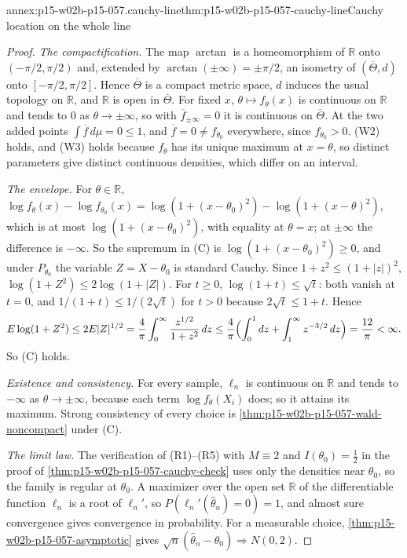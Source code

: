 \begin{annexitem}{annex:p15-w02b-p15-057.cauchy-line}{thm:p15-w02b-p15-057-cauchy-line}{Cauchy location on the whole line}
\begin{proof}
\emph{The compactification.} The map \(\arctan\) is a homeomorphism of
\(\mathbb R\) onto \((-\pi/2,\pi/2)\) and, extended by
\(\arctan(\pm\infty)=\pm\pi/2\), an isometry of
\((\overline\Theta,d)\) onto \([-\pi/2,\pi/2]\). Hence \(\overline\Theta\)
is a compact metric space, \(d\) induces the usual topology on
\(\mathbb R\), and \(\mathbb R\) is open in \(\overline\Theta\). For fixed
\(x\), \(\theta\mapsto f_\theta(x)\) is continuous on \(\mathbb R\) and
tends to \(0\) as \(\theta\to\pm\infty\), so with
\(\overline f_{\pm\infty}=0\) it is continuous on \(\overline\Theta\). At the
two added points \(\int\overline f\,d\mu=0\leq1\), and
\(\overline f=0\neq f_{\theta_0}\) everywhere, since \(f_{\theta_0}>0\).
(W2) holds, and (W3) holds because \(f_\theta\) has its unique maximum at
\(x=\theta\), so distinct parameters give distinct continuous densities,
which differ on an interval.

\emph{The envelope.} For \(\theta\in\mathbb R\),
\(\log f_\theta(x)-\log f_{\theta_0}(x)=\log(1+(x-\theta_0)^2)
-\log(1+(x-\theta)^2)\), which is at most \(\log(1+(x-\theta_0)^2)\), with
equality at \(\theta=x\); at \(\pm\infty\) the difference is \(-\infty\). So
the supremum in (C) is \(\log(1+(x-\theta_0)^2)\geq0\), and under
\(P_{\theta_0}\) the variable \(Z=X-\theta_0\) is standard Cauchy. Since
\(1+z^2\leq(1+|z|)^2\), \(\log(1+Z^2)\leq2\log(1+|Z|)\). For \(t\geq0\),
\(\log(1+t)\leq\sqrt t\): both vanish at \(t=0\), and
\(1/(1+t)\leq1/(2\sqrt t)\) for \(t>0\) because \(2\sqrt t\leq1+t\). Hence
\[
 E\log(1+Z^2)\leq2E|Z|^{1/2}
 =\frac4\pi\int_0^\infty\frac{z^{1/2}}{1+z^2}\,dz
 \leq\frac4\pi\Bigl(\int_0^1dz+\int_1^\infty z^{-3/2}\,dz\Bigr)
 =\frac{12}\pi<\infty .
\]
So (C) holds.

\emph{Existence and consistency.} For every sample, \(\ell_n\) is
continuous on \(\mathbb R\) and tends to \(-\infty\) as
\(\theta\to\pm\infty\), because each term \(\log f_\theta(X_i)\) does; so
it attains its maximum. Strong consistency of every choice is
\cref{thm:p15-w02b-p15-057-wald-noncompact} under (C).

\emph{The limit law.} The verification of (R1)--(R5) with \(M\equiv2\) and
\(I(\theta_0)=\tfrac12\) in the proof of
\cref{thm:p15-w02b-p15-057-cauchy-check} uses only the densities near
\(\theta_0\), so the family is regular at \(\theta_0\). A maximizer over
the open set \(\mathbb R\) of the differentiable function \(\ell_n\) is a
root of \(\ell_n'\), so \(P(\ell_n'(\widehat\theta_n)=0)=1\), and almost
sure convergence gives convergence in probability. For a measurable choice,
\cref{thm:p15-w02b-p15-057-asymptotic} gives
\(\sqrt n(\widehat\theta_n-\theta_0)\Rightarrow N(0,2)\).
\end{proof}
\end{annexitem}

